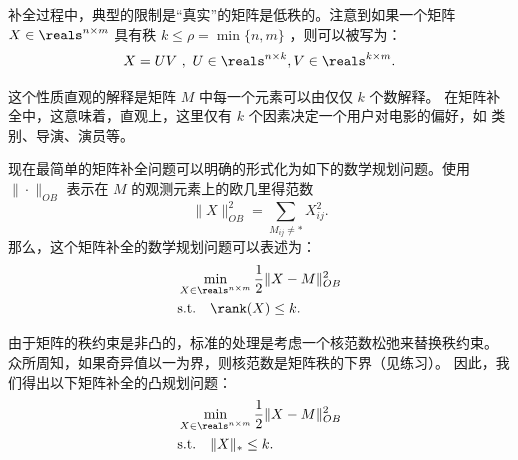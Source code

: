 补全过程中，典型的限制是“真实”的矩阵是低秩的。注意到如果一个矩阵 $X \in \reals^{n \times m}$ 具有秩  $k \leq \rho = \min \{n,m\} $ ，则可以被写为：
$$ X = U V \ , \ U \in \reals^{n \times k} , V \in \reals^{k \times m}.  $$


这个性质直观的解释是矩阵 $M$ 中每一个元素可以由仅仅 $k$ 个数解释。
在矩阵补全中，这意味着，直观上，这里仅有 $k$ 个因素决定一个用户对电影的偏好，如 类别、导演、演员等。

现在最简单的矩阵补全问题可以明确的形式化为如下的数学规划问题。使用 $\| \cdot \|_{OB}$ 表示在 $M$ 的观测元素上的欧几里得范数
$$\|X\|_{OB}^2 = \sum_{M_{ij} \neq *} X_{ij}^2.$$ 
那么，这个矩阵补全的数学规划问题可以表述为：
\begin{align*}
& \min_{X \in \reals^{n \times m} } \frac{1}{2} \| X - M \|_{OB}^2 \\
& \text{s.t.} \quad \rank(X) \leq k. 
\end{align*}  

由于矩阵的秩约束是非凸的，标准的处理是考虑一个核范数松弛来替换秩约束。
众所周知，如果奇异值以一为界，则核范数是矩阵秩的下界（见练习）。
因此，我们得出以下矩阵补全的凸规划问题：
\begin{align} \label{eqn:matrix-completion}
& \min_{X \in \reals^{n \times m} }  \frac{1}{2} \| X - M \|_{OB}^2 \\
& \text{s.t.} \quad \|X\|_* \leq k. \notag 
\end{align}  

